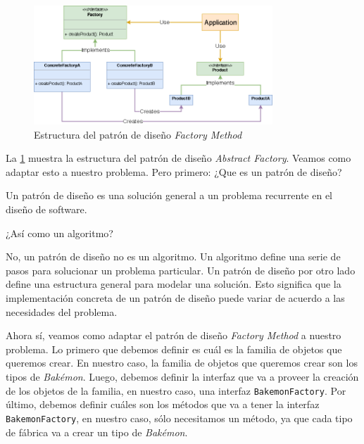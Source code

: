   \begin{figure}[ht!]
    \centering
    \includegraphics[width=0.8\textwidth]{img/oop/factory/abstract_factory.png}
    \caption{Estructura del patrón de diseño \textit{Factory Method}}
    \label{fig:abstract_factory}
  \end{figure}

  La \cref{fig:abstract_factory} muestra la estructura del patrón de diseño \textit{Abstract 
  Factory}.
  Veamos como adaptar esto a nuestro problema.
  Pero primero: ¿Que es un patrón de diseño?

  \begin{defaultbox}
    Un patrón de diseño es una solución general a un problema recurrente en el diseño de software.    
  \end{defaultbox}

  \begin{center}
    ¿Así como un algoritmo?
  \end{center}

  No, un patrón de diseño no es un algoritmo.
  Un algoritmo define una serie de pasos para solucionar un problema particular.
  Un patrón de diseño por otro lado define una estructura general para modelar una solución.
  Esto significa que la implementación concreta de un patrón de diseño puede variar de acuerdo a
  las necesidades del problema.
  
  Ahora sí, veamos como adaptar el patrón de diseño \textit{Factory Method} a nuestro problema.
  Lo primero que debemos definir es cuál es la familia de objetos que queremos crear.
  En nuestro caso, la familia de objetos que queremos crear son los tipos de \textit{Bakémon}.
  Luego, debemos definir la interfaz que va a proveer la creación de los objetos de la familia, en
  nuestro caso, una interfaz \texttt{BakemonFactory}.
  Por último, debemos definir cuáles son los métodos que va a tener la interfaz 
  \texttt{BakemonFactory}, en nuestro caso, sólo necesitamos un método, ya que cada tipo de
  fábrica va a crear un tipo de \textit{Bakémon}.

